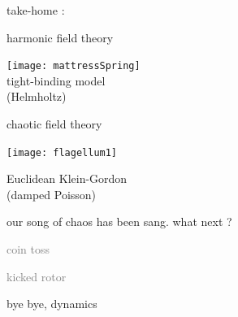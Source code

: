 \begin{frame}{take-home :   }
\begin{center}
            \begin{minipage}[c]{0.40\textwidth}\begin{center}
{\color{purple}harmonic} field theory
\bigskip

\texttt{[image: mattressSpring]}\\
{\color{blue}tight-binding} model \\ ({\color{blue}Helmholtz})
            \end{center}\end{minipage}
            \hspace{2ex}
            \begin{minipage}[c]{0.46\textwidth}\begin{center}
{\color{purple}chaotic} field theory\\
\bigskip
\bigskip
\bigskip

\texttt{[image: flagellum1]}\\
\bigskip

Euclidean {\color{blue}Klein-Gordon} \\ (damped {\color{blue}Poisson})
            \end{center}\end{minipage}
\end{center}
\end{frame}%

\begin{frame}{our song of chaos has been sang. what next ?}
\begin{enumerate}
              \item \textcolor{gray}{\small
coin toss
              \item
kicked rotor
              \item
\catlatt
                  }
              \item {\Large
bye bye, dynamics
                    }
            \end{enumerate}
\end{frame} %





